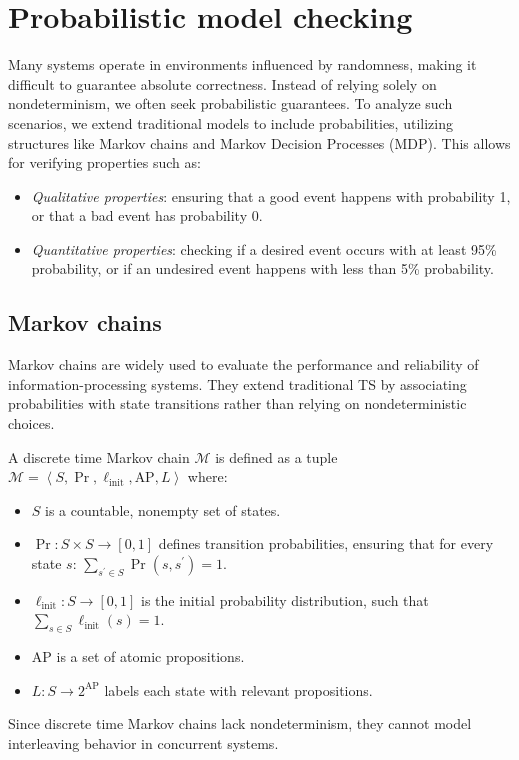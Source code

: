 \section{Probabilistic model checking}

Many systems operate in environments influenced by randomness, making it difficult to guarantee absolute correctness.
Instead of relying solely on nondeterminism, we often seek probabilistic guarantees.
To analyze such scenarios, we extend traditional models to include probabilities, utilizing structures like Markov chains and Markov Decision Processes (MDP). 
This allows for verifying properties such as:
\begin{itemize}
    \item \textit{Qualitative properties}: ensuring that a good event happens with probability 1, or that a bad event has probability 0.
    \item \textit{Quantitative properties}: checking if a desired event occurs with at least 95\% probability, or if an undesired event happens with less than 5\% probability.
\end{itemize}

\subsection{Markov chains}
Markov chains are widely used to evaluate the performance and reliability of information-processing systems. 
They extend traditional TS by associating probabilities with state transitions rather than relying on nondeterministic choices.
\begin{definition}
    A discrete time Markov chain $\mathcal{M}$ is defined as a tuple $\mathcal{M}=\left\langle S,\Pr,\ell_{\text{init}},\text{AP},L\right\rangle$ where: 
    \begin{itemize}
        \item $S$ is a countable, nonempty set of states.
        \item $\Pr : S \times S \rightarrow [0, 1]$ defines transition probabilities, ensuring that for every state $s$: $\sum_{s^\prime\in S}\Pr(s,s^\prime)=1$. 
        \item $\ell_{\text{init}}:S\rightarrow [0,1]$ is the initial probability distribution, such that $\sum_{s\in S}\ell_{\text{init}}(s)=1$.
        \item $\text{AP}$ is a set of atomic propositions.
        \item $L : S \rightarrow 2^{\text{AP}}$ labels each state with relevant propositions.
    \end{itemize}
\end{definition}
\noindent Since discrete time Markov chains lack nondeterminism, they cannot model interleaving behavior in concurrent systems.

